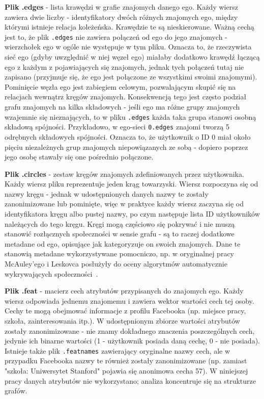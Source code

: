 \textbf{Plik .edges} - lista krawędzi w grafie znajomych danego ego. Każdy wiersz zawiera dwie liczby - identyfikatory dwóch różnych znajomych ego, między którymi istnieje relacja koleżeńska. Krawędzie te są nieskierowane. Ważną cechą jest to, że plik \verb|.edges| nie zawiera połączeń od ego do jego znajomych - wierzchołek ego w ogóle nie występuje w tym pliku. Oznacza to, że rzeczywista sieć ego (gdyby uwzględnić w niej węzeł ego) miałaby dodatkowo krawędź łączącą ego z każdym z pojawiających się znajomych, jednak tych połączeń tutaj nie zapisano (przyjmuje się, że ego jest połączone ze wszystkimi swoimi znajomymi). Pominięcie węzła ego jest zabiegiem celowym, pozwalającym skupić się na relacjach wewnątrz kręgów znajomych. Konsekwencją tego jest często podział grafu znajomych na kilka składowych - jeśli ego ma różne grupy znajomych wzajemnie się nieznających, to w pliku \verb|.edges| każda taka grupa stanowi osobną składową spójności. Przykładowo, w ego-sieci \verb|0.edges| znajomi tworzą 5 odrębnych składowych spójności. Oznacza to, że użytkownik o ID 0 miał około pięciu niezależnych grup znajomych niepowiązanych ze sobą - dopiero poprzez jego osobę stawały się one pośrednio połączone.

\textbf{Plik .circles} - zestaw kręgów znajomych zdefiniowanych przez użytkownika. Każdy wiersz pliku reprezentuje jeden krąg towarzyski. Wiersz rozpoczyna się od nazwy kręgu - jednak w udostępnionych danych nazwy te zostały zanonimizowane lub pominięte, więc w praktyce każdy wiersz zaczyna się od identyfikatora kręgu albo pustej nazwy, po czym następuje lista ID użytkowników należących do tego kręgu. Kręgi mogą częściowo się pokrywać i nie muszą stanowić rozłącznych społeczności w sensie grafu - są to raczej dodatkowe metadane od ego, opisujące jak kategoryzuje on swoich znajomych. Dane te stanowią metadane wykorzystywane pomocniczo, np. w oryginalnej pracy McAuley'ego i Leskovca posłużyły do oceny algorytmów automatycznie wykrywających społeczności~\cite{McAuley2012}.

\textbf{Plik .feat} - macierz cech atrybutów przypisanych do znajomych ego. Każdy wiersz odpowiada jednemu znajomemu i zawiera wektor wartości cech tej osoby. Cechy te mogą obejmować informacje z profilu Facebooka (np. miejsce pracy, szkoła, zainteresowania itp.). W udostępnionym zbiorze wartości atrybutów zostały zanonimizowane - nie znamy dokładnego znaczenia poszczególnych cech, jedynie ich binarne wartości (1 - użytkownik posiada daną cechę, 0 - nie posiada). Istnieje także plik \verb|.featnames| zawierający oryginalne nazwy cech, ale w przypadku Facebooka nazwy te również zostały zanonimizowane (np. zamiast "szkoła: Uniwersytet Stanford" pojawia się anonimowa cecha 57). W niniejszej pracy danych atrybutów nie wykorzystano; analiza koncentruje się na strukturze grafów.


